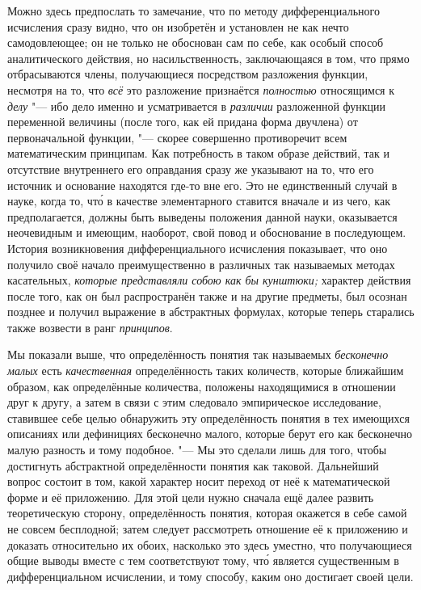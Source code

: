 Можно здесь предпослать то замечание, что по методу дифференциального
исчисления сразу видно, что он изобретён и установлен не как нечто
самодовлеющее; он не только не обоснован сам по себе, как особый способ
аналитического действия, но насильственность, заключающаяся в том, что прямо
отбрасываются члены, получающиеся посредством разложения функции, несмотря на
то, что {\em всё} это разложение признаётся {\em полностью} относящимся к
{\em делу} "--- ибо дело именно и усматривается в {\em различии} разложенной
функции переменной величины (после того, как ей придана форма двучлена) от
первоначальной функции, "--- скорее совершенно противоречит всем математическим
принципам. Как потребность в таком образе действий, так и отсутствие
внутреннего его оправдания сразу же указывают на то, что его источник и
основание находятся где-то вне его. Это не единственный случай в науке, когда
то, чт\'{о} в качестве элементарного ставится вначале и из чего, как
предполагается, должны быть выведены положения данной науки, оказывается
неочевидным и имеющим, наоборот, свой повод и обоснование в последующем.
История возникновения дифференциального исчисления показывает, что оно получило
своё начало преимущественно в различных так называемых методах касательных,
{\em которые представляли собою как бы кунштюки;} характер действия после того,
как он был распространён также и на другие предметы, был осознан позднее и
получил выражение в абстрактных формулах, которые теперь старались также
возвести в ранг {\em принципов}.

Мы показали выше, что определённость понятия так называемых
{\em бесконечно малых} есть {\em качественная} определённость таких количеств,
которые ближайшим образом, как определённые количества, положены находящимися в
отношении друг к другу, а затем в связи с этим следовало эмпирическое
исследование, ставившее себе целью обнаружить эту определённость понятия в тех
имеющихся описаниях или дефинициях бесконечно малого, которые берут его как
бесконечно малую разность и тому подобное. "--- Мы это сделали лишь для того,
чтобы достигнуть абстрактной определённости понятия как таковой. Дальнейший
вопрос состоит в том, какой характер носит переход от неё к математической
форме и её приложению. Для этой цели нужно сначала ещё далее развить
теоретическую сторону, определённость понятия, которая окажется в себе самой не
совсем бесплодной; затем следует рассмотреть отношение её к приложению и
доказать относительно их обоих, насколько это здесь уместно, что получающиеся
общие выводы вместе с тем соответствуют тому, чт\'{о} является существенным в
дифференциальном исчислении, и тому способу, каким оно достигает своей цели.

